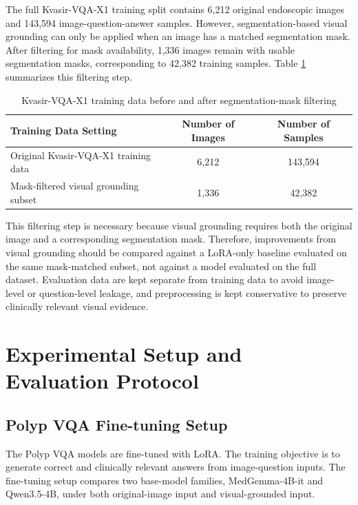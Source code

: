 The full Kvasir-VQA-X1 training split contains 6,212 original endoscopic images and 143,594 image-question-answer samples. However, segmentation-based visual grounding can only be applied when an image has a matched segmentation mask. After filtering for mask availability, 1,336 images remain with usable segmentation masks, corresponding to 42,382 training samples. Table \ref{table:kvasir-vqa-mask-filtering} summarizes this filtering step.

\begin{table}[H]
\centering
\begin{tabularx}{\textwidth}{>{\raggedright\arraybackslash}X c c}
\hline\hline
Training Data Setting & Number of Images & Number of Samples \\
\hline
Original Kvasir-VQA-X1 training data & 6,212 & 143,594 \\
Mask-filtered visual grounding subset & 1,336 & 42,382 \\
\hline\hline
\end{tabularx}
\caption{Kvasir-VQA-X1 training data before and after segmentation-mask filtering}
\label{table:kvasir-vqa-mask-filtering}
\end{table}

This filtering step is necessary because visual grounding requires both the original image and a corresponding segmentation mask. Therefore, improvements from visual grounding should be compared against a LoRA-only baseline evaluated on the same mask-matched subset, not against a model evaluated on the full dataset. Evaluation data are kept separate from training data to avoid image-level or question-level leakage, and preprocessing is kept conservative to preserve clinically relevant visual evidence.

\section{Experimental Setup and Evaluation Protocol}

\subsection{Polyp VQA Fine-tuning Setup}

The Polyp VQA models are fine-tuned with LoRA. The training objective is to generate correct and clinically relevant answers from image-question inputs. The fine-tuning setup compares two base-model families, MedGemma-4B-it and Qwen3.5-4B, under both original-image input and visual-grounded input.

